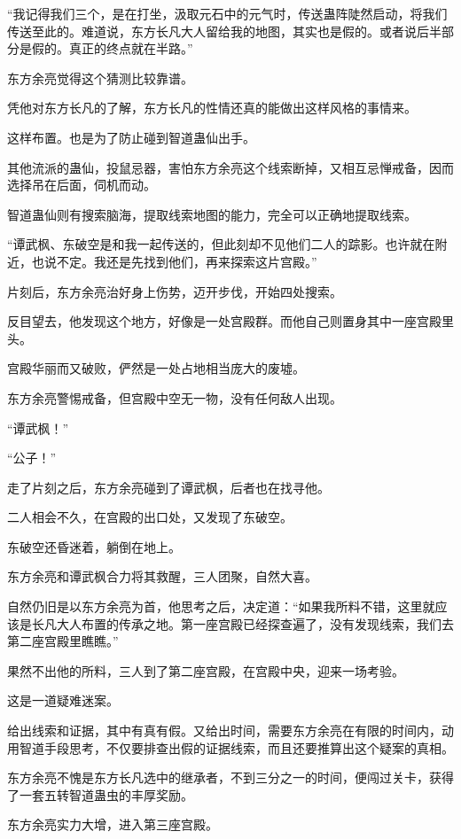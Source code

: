\begin{this_body}
“我记得我们三个，是在打坐，汲取元石中的元气时，传送蛊阵陡然启动，将我们传送至此的。难道说，东方长凡大人留给我的地图，其实也是假的。或者说后半部分是假的。真正的终点就在半路。”

东方余亮觉得这个猜测比较靠谱。

凭他对东方长凡的了解，东方长凡的性情还真的能做出这样风格的事情来。

这样布置。也是为了防止碰到智道蛊仙出手。

其他流派的蛊仙，投鼠忌器，害怕东方余亮这个线索断掉，又相互忌惮戒备，因而选择吊在后面，伺机而动。

智道蛊仙则有搜索脑海，提取线索地图的能力，完全可以正确地提取线索。

“谭武枫、东破空是和我一起传送的，但此刻却不见他们二人的踪影。也许就在附近，也说不定。我还是先找到他们，再来探索这片宫殿。”

片刻后，东方余亮治好身上伤势，迈开步伐，开始四处搜索。

反目望去，他发现这个地方，好像是一处宫殿群。而他自己则置身其中一座宫殿里头。

宫殿华丽而又破败，俨然是一处占地相当庞大的废墟。

东方余亮警惕戒备，但宫殿中空无一物，没有任何敌人出现。

“谭武枫！”

“公子！”

走了片刻之后，东方余亮碰到了谭武枫，后者也在找寻他。

二人相会不久，在宫殿的出口处，又发现了东破空。

东破空还昏迷着，躺倒在地上。

东方余亮和谭武枫合力将其救醒，三人团聚，自然大喜。

自然仍旧是以东方余亮为首，他思考之后，决定道：“如果我所料不错，这里就应该是长凡大人布置的传承之地。第一座宫殿已经探查遍了，没有发现线索，我们去第二座宫殿里瞧瞧。”

果然不出他的所料，三人到了第二座宫殿，在宫殿中央，迎来一场考验。

这是一道疑难迷案。

给出线索和证据，其中有真有假。又给出时间，需要东方余亮在有限的时间内，动用智道手段思考，不仅要排查出假的证据线索，而且还要推算出这个疑案的真相。

东方余亮不愧是东方长凡选中的继承者，不到三分之一的时间，便闯过关卡，获得了一套五转智道蛊虫的丰厚奖励。

东方余亮实力大增，进入第三座宫殿。


\end{this_body}
